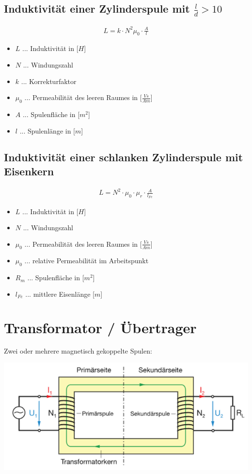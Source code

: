 \subsection{Induktivität einer Zylinderspule mit $\frac{l}{d}>10$}
\begin{align}
    L=k\cdot N^2 \mu_0 \cdot \frac{A}{l}
\end{align}
\begin{itemize}
    \item $L$ ... Induktivität in [$H$]
    \item $N$ ... Windungszahl
    \item $k$ ... Korrekturfaktor
    \item $\mu_0$ ... Permeabilität des leeren Raumes in [$\frac{Vs}{Am}$]
    \item $A$ ... Spulenfläche in [$m^2$]
    \item $l$ ... Spulenlänge in [$m$]
\end{itemize}

\subsection{Induktivität einer schlanken Zylinderspule mit Eisenkern}
\begin{align}
    L=N^2\cdot\mu_0\cdot\mu_r\cdot \frac{A}{l_{Fe}}
\end{align}
\begin{itemize}
    \item $L$ ... Induktivität in [$H$]
    \item $N$ ... Windungszahl
    \item $\mu_0$ ... Permeabilität des leeren Raumes in [$\frac{Vs}{Am}$]
    \item $\mu_0$ ... relative Permeabilität im Arbeitspunkt
    \item $R_m$ ... Spulenfläche in [$m^2$]
    \item $l_{Fe}$ ... mittlere Eisenlänge [$m$]
\end{itemize}

\newpage

\section{Transformator / Übertrager}
Zwei oder mehrere magnetisch gekoppelte Spulen:

\includegraphics[width=0.7 \linewidth]{LineareBauteile/Traffo.png}

